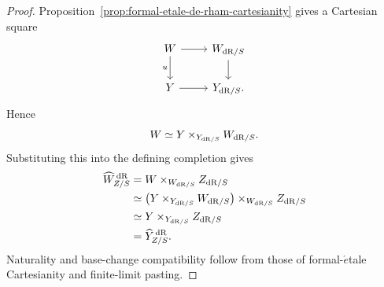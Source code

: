 \begin{proof}
Proposition~\ref{prop:formal-etale-de-rham-cartesianity} gives a Cartesian square
\[
\begin{tikzcd}
    W \ar[r] \ar[d,"u"']
        & W_{\dR/S} \ar[d]
    \\
    Y \ar[r]
        & Y_{\dR/S}.
\end{tikzcd}
\]
Hence
\[
    W
    \simeq
    Y\times_{Y_{\mathrm{dR}/S}}W_{\mathrm{dR}/S}.
\]
Substituting this into the defining completion gives
\[
\begin{aligned}
    \widehat W^{\,\mathrm{dR}}_{Z/S}
    &=
    W\times_{W_{\mathrm{dR}/S}}Z_{\mathrm{dR}/S}
    \\
    &\simeq
    \left(
        Y\times_{Y_{\mathrm{dR}/S}}W_{\mathrm{dR}/S}
    \right)
    \times_{W_{\mathrm{dR}/S}}Z_{\mathrm{dR}/S}
    \\
    &\simeq
    Y\times_{Y_{\mathrm{dR}/S}}Z_{\mathrm{dR}/S}
    \\
    &=
    \widehat Y^{\,\mathrm{dR}}_{Z/S}.
\end{aligned}
\]
Naturality and base-change compatibility follow from those of formal-\(\acute{e}\)tale
Cartesianity and finite-limit pasting.
\end{proof}


